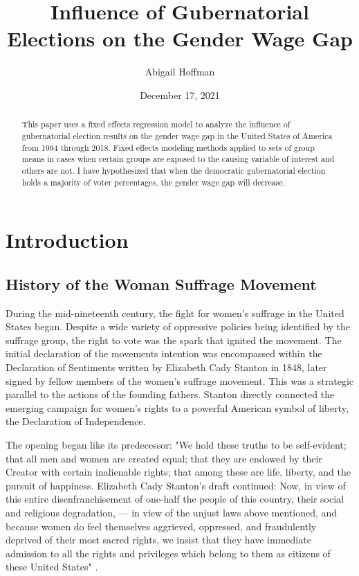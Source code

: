 \documentclass[12pt, English]{article}
\title{Influence of Gubernatorial Elections on the Gender Wage Gap}
\author{Abigail Hoffman}
\date{December 17, 2021}
\begin{document}
\maketitle
\begin{abstract}

This paper uses a fixed effects regression model to analyze the influence of gubernatorial election results on the gender wage gap in the United States of America from 1994 through 2018. Fixed effects modeling methods applied to sets of group means in cases when certain groups are exposed to the causing variable of interest and others are not. I have hypothesized that when the democratic gubernatorial election holds a majority of voter percentages, the gender wage gap will decrease. 
\end{abstract}

\newpage

\section{Introduction}
\doublespacing
\subsection*{History of the Woman Suffrage Movement}
During the mid-nineteenth century, the fight for women's suffrage in the United States began. Despite a wide variety of oppressive policies being identified by the suffrage group, the right to vote was the spark that ignited the movement. The initial declaration of the movements intention was encompassed within the Declaration of Sentiments written by Elizabeth Cady Stanton in 1848, later signed by fellow members of the women's suffrage movement. This was a strategic parallel to the actions of the founding fathers. Stanton directly connected the emerging campaign for women's rights to a powerful American symbol of liberty, the Declaration of Independence. 
\begin{displayquote}

The opening began like its predecessor: "We hold these truths to be self-evident; that all men and women are created equal; that they are endowed by their Creator with certain inalienable rights; that among these are life, liberty, and the pursuit of happiness. Elizabeth Cady Stanton's draft continued: Now, in view of this entire disenfranchisement of one-half the people of this country, their social and religious degradation, — in view of the unjust laws above mentioned, and because women do feel themselves aggrieved, oppressed, and fraudulently deprived of their most sacred rights, we insist that they have immediate admission to all the rights and privileges which belong to them as citizens of these United States" \citep{NWHA}.
\end{displayquote}
\end{document}
